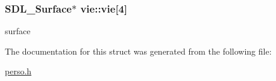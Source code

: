 \subsubsection[{\texorpdfstring{vie}{vie}}]{\setlength{\rightskip}{0pt plus 5cm}S\+D\+L\+\_\+\+Surface$\ast$ vie\+::vie\mbox{[}4\mbox{]}}\hypertarget{structvie_a2c29f60898de16e1306bd1043fa38dc9}{}\label{structvie_a2c29f60898de16e1306bd1043fa38dc9}
surface 

The documentation for this struct was generated from the following file\+:\begin{DoxyCompactItemize}
\item 
\hyperlink{perso_8h}{perso.\+h}\end{DoxyCompactItemize}
